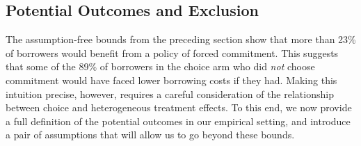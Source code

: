 \documentclass[12pt, a4paper]{article}
\begin{document}
%

\subsection{Potential Outcomes and Exclusion}
\label{sec:potentialOutcomes}

The assumption-free \cite{fan2010sharp} bounds from the preceding section show that more than 23\% of borrowers would benefit from a policy of forced commitment. 
This suggests that some of the 89\% of borrowers in the choice arm who did \emph{not} choose commitment would have faced lower borrowing costs if they had.
Making this intuition precise, however, requires a careful consideration of the relationship between choice and heterogeneous treatment effects. 
To this end, we now provide a full definition of the potential outcomes in our empirical setting, and introduce a pair of assumptions that will allow us to go beyond these bounds.
\end{document}
